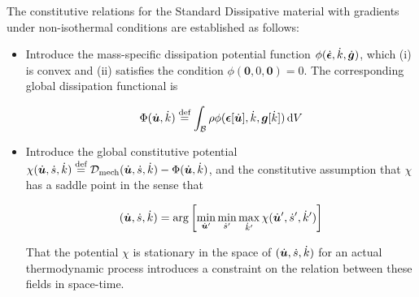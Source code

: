 The constitutive relations for the Standard Dissipative material with 
gradients under non-isothermal conditions are established as follows:
\begin{itemize}
  \item Introduce the mass-specific dissipation potential function 
  $\phi(\dot{\bm{\epsilon}},\dot{k},\dot{\bm {g}})$, which (i) is convex and (ii) 
  satisfies the condition $\phi(\bm{0},0,\bm{0})=0$. The corresponding
  global dissipation functional is

  $$ \Phi(\dot{\bm {u}},\dot{k}) \stackrel{\text{def}}{=} \int_{\mathcal{B}}  \rho\phi(\bm{\epsilon}[\dot{\bm {u}}],\dot{k},\bm {g}[\dot{k}])  \mathop{}\!\mathrm{d} V $$

  \item Introduce the global constitutive potential 
  $\chi(\dot{\bm {u}},\dot{s},\dot{k})\stackrel{\text{def}}{=} {\mathcal D}_{\mathrm{mech}}(\dot{\bm {u}},
  \dot{s},\dot{k})-\Phi(\dot{\bm {u}},\dot{k})$, and the constitutive assumption 
  that $\chi$ has a saddle point in the sense that

  $$ (\dot{\bm {u}},\dot{s},\dot{k}) = \arg\left[\min_{\dot{\bm {u}}'}\min_{\dot{s}'}\max_{\dot{k}'}
  \chi(\dot{\bm {u}}',\dot{s}',\dot{k}') \right]$$

That the potential $\chi$ is stationary in the space of $(\dot{\bm {u}},\dot{s},\dot{k})$ 
for an actual thermodynamic process introduces a constraint on the relation between 
these fields in space-time.
\end{itemize}

